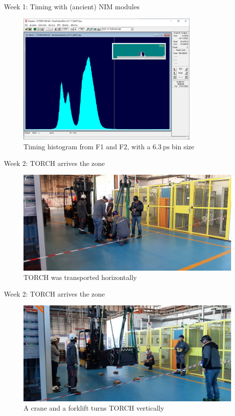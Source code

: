 \documentclass{beamer}
\begin{document}
\begin{frame}{Week 1: Timing with (ancient) NIM modules}
  \begin{figure}
    \centering
    \includegraphics[width = 0.8\textwidth]{Plots/PionProton8GeV_221117_08h07.png}
    \caption{Timing histogram from F1 and F2, with a $\SI{6.3}{\pico\second}$ bin size}
  \end{figure}
\end{frame}

\begin{frame}{Week 2: TORCH arrives the zone}
  \begin{figure}
    \centering
    \includegraphics[width = 1.0\textwidth]{Plots/TORCH_transport_0.jpg}
    \caption{TORCH was transported horizontally}
  \end{figure}
\end{frame}

\begin{frame}{Week 2: TORCH arrives the zone}
  \begin{figure}
    \centering
    \includegraphics[width = 1.0\textwidth]{Plots/TORCH_transport_1.jpg}
    \caption{A crane and a forklift turns TORCH vertically}
  \end{figure}
\end{frame}
\end{document}

